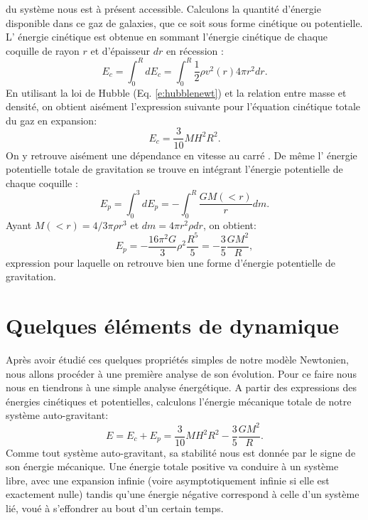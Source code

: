  du système nous est à présent accessible. Calculons la quantité d'énergie disponible dans ce gaz de galaxies, que ce soit sous forme cinétique ou potentielle. L' énergie cinétique  est obtenue en sommant l'énergie cinétique de chaque coquille de rayon $r$ et d'épaisseur $dr$ en récession :
\begin{equation}
E_c=\int_0^R dE_c=\int_0^R \frac{1}{2}\rho  v^2(r) 4\pi r^2  dr.
\end{equation}
En utilisant la loi de Hubble (Eq. \ref{e:hubblenewt}) et la relation entre masse et densité, on obtient aisément l'expression suivante pour l'équation cinétique totale du gaz en expansion:
\begin{equation}
E_c=\frac{3}{10} M H^2 R^2.
\end{equation}
On y retrouve aisément une dépendance en vitesse au carré . De même l' énergie potentielle  totale de gravitation se trouve en intégrant l'énergie potentielle de chaque coquille :
\begin{equation}
E_p=\int_0^3 dE_p=-\int_0^R \frac{GM(<r)}{r}dm.
\end{equation}
Ayant $M(<r)=4/3\pi \rho r^3$ et $dm= 4\pi r^2 \rho dr$, on obtient:
\begin{equation}
E_p=-\frac{16 \pi^2 G}{3} \rho^2 \frac{R^5}{5}= -\frac{3}{5}\frac{GM^2}{R},
\end{equation} 
expression pour laquelle on retrouve bien une forme d'énergie potentielle de gravitation.

\section{Quelques éléments de dynamique}
Après avoir étudié ces quelques propriétés simples de notre modèle Newtonien, nous allons procéder à une première analyse de son évolution. Pour ce faire nous nous en tiendrons à une simple analyse énergétique. A partir des expressions des énergies cinétiques et potentielles, calculons l'énergie mécanique  totale de notre système auto-gravitant:
\begin{equation}
E=E_c+E_p=\frac{3}{10} M H^2 R^2 - \frac{3}{5}\frac{GM^2}{R}.
\end{equation}
Comme tout système auto-gravitant, sa stabilité nous est donnée par le signe de son énergie mécanique. Une énergie totale positive va conduire à un système libre, avec une expansion infinie (voire asymptotiquement infinie si elle est exactement nulle) tandis qu'une énergie négative correspond à celle d'un système lié, voué à s'effondrer au bout d'un certain temps.

